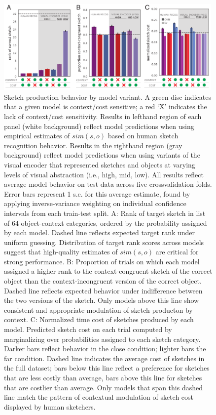 \documentclass{svjour3}
\begin{document}
\begin{figure}[htbp]
\centering
\includegraphics[width=0.99\textwidth]{5_model_results_2.pdf}
\caption{Sketch production behavior by model variant. 
A green disc indicates that a given model is context/cost sensitive; a red `X' indicates the lack of context/cost sensitivity. 
Results in lefthand region of each panel (white background) reflect model predictions when using empirical estimates of $sim(s,o)$ based on human sketch recognition behavior. 
Results in the righthand region (gray background) reflect model predictions when using variants of the visual encoder that represented sketches and objects at varying levels of visual abstraction (i.e., high, mid, low).
All results reflect average model behavior on test data across five crossvalidation folds. 
Error bars represent 1 s.e. for this average estimate, found by applying inverse-variance weighting on individual confidence intervals from each train-test split. 
A: Rank of target sketch in list of 64 object-context categories, ordered by the probability assigned by each model. 
Dashed line reflects expected target rank under uniform guessing. 
Distribution of target rank scores across models suggest that high-quality estimates of $sim(s,o)$ are critical for strong performance. 
B: Proportion of trials on which each model assigned a higher rank to the context-congruent sketch of the correct object than the context-incongruent version of the correct object. 
Dashed line reflects expected behavior under indifference between the two versions of the sketch. 
Only models above this line show consistent and appropriate modulation of sketch producton by context. 
C: Normalized time cost of sketches produced by each model.
Predicted sketch cost on each trial computed by marginalizing over probabilities assigned to each sketch category. 
Darker bars reflect behavior in the close condition; lighter bars the far condition. 
Dashed line indicates the average cost of sketches in the full dataset; bars below this line reflect a preference for sketches that are less costly than average, bars above this line for sketches that are costlier than average. 
Only models that span this dashed line match the pattern of contextual modulation of sketch cost displayed by human sketchers.}
\label{model_results}
\end{figure}
\end{document}
